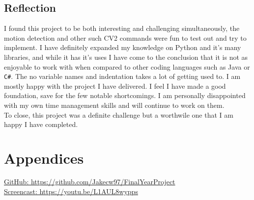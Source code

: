 \section {Reflection}
I found this project to be both interesting and challenging simultaneously, the motion detection and other such CV2 commands were fun to test out and try to implement. I have definitely expanded my knowledge on Python and it's many libraries, and while it has it's uses I have come to the conclusion that it is not as enjoyable to work with when compared to other coding languages such as Java or \verb|C#|. The  no variable names and indentation takes a lot of getting used to. I am mostly happy with the project I have delivered. I feel I have made a good foundation, save for the few notable shortcomings. I am personally disappointed with my own time management skills and will continue to work on them. \\
To close, this project was a definite challenge but a worthwile one that I am happy I have completed. 

\chapter{Appendices}
\href{https://github.com/Jakecw97/FinalYearProject}{GitHub: https://github.com/Jakecw97/FinalYearProject}\\
\href{https://youtu.be/L1AUL8wypps}{Screencast: https://youtu.be/L1AUL8wypps}